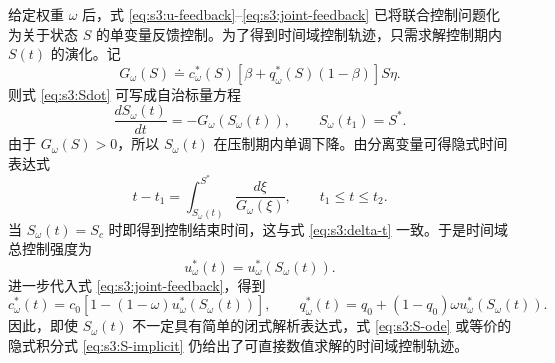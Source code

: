 给定权重 $\omega$ 后，式 \eqref{eq:s3:u-feedback}--\eqref{eq:s3:joint-feedback} 已将联合控制问题化为关于状态 $S$ 的单变量反馈控制。为了得到时间域控制轨迹，只需求解控制期内 $S(t)$ 的演化。记
\begin{equation}
G_\omega(S)
\doteq
c_\omega^*(S)
\left[
\beta+q_\omega^*(S)(1-\beta)
\right]S\eta.
\label{eq:s3:Gomega}
\end{equation}
则式 \eqref{eq:s3:Sdot} 可写成自治标量方程
\begin{equation}
\frac{dS_\omega(t)}{dt}
=
-G_\omega(S_\omega(t)),
\qquad
S_\omega(t_1)=S^*.
\label{eq:s3:S-ode}
\end{equation}
由于 $G_\omega(S)>0$，所以 $S_\omega(t)$ 在压制期内单调下降。由分离变量可得隐式时间表达式
\begin{equation}
t-t_1
=
\int_{S_\omega(t)}^{S^*}
\frac{d\xi}{G_\omega(\xi)},
\qquad
t_1\le t\le t_2.
\label{eq:s3:S-implicit}
\end{equation}
当 $S_\omega(t)=S_c$ 时即得到控制结束时间，这与式 \eqref{eq:s3:delta-t} 一致。于是时间域总控制强度为
\begin{equation}
u_\omega^*(t)
=
u_\omega^*(S_\omega(t)).
\label{eq:s3:u-time}
\end{equation}
进一步代入式 \eqref{eq:s3:joint-feedback}，得到
\begin{equation}
c_\omega^*(t)
=
c_0\left[1-(1-\omega)u_\omega^*(S_\omega(t))\right],
\qquad
q_\omega^*(t)
=
q_0+(1-q_0)\omega u_\omega^*(S_\omega(t)).
\label{eq:s3:cq-time}
\end{equation}
因此，即使 $S_\omega(t)$ 不一定具有简单的闭式解析表达式，式 \eqref{eq:s3:S-ode} 或等价的隐式积分式 \eqref{eq:s3:S-implicit} 仍给出了可直接数值求解的时间域控制轨迹。


